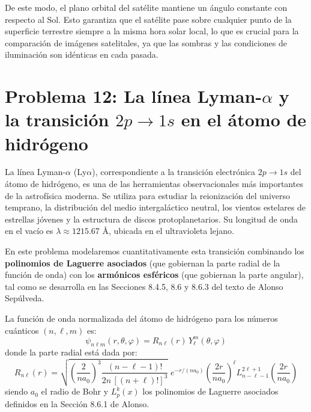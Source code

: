 \documentclass[a4paper]{article}
\begin{document}
De este modo, el plano orbital del satélite mantiene un ángulo constante con respecto al Sol. Esto garantiza que el satélite pase sobre cualquier punto de la superficie terrestre siempre a la misma hora solar local, lo que es crucial para la comparación de imágenes satelitales, ya que las sombras y las condiciones de iluminación son idénticas en cada pasada.



\section{Problema 12: La línea Lyman-$\alpha$ y la transición $2p \to 1s$ en el átomo de hidrógeno}

La línea Lyman-$\alpha$ (Ly$\alpha$), correspondiente a la transición electrónica $2p \to 1s$ del átomo de hidrógeno, es una de las herramientas observacionales más importantes de la astrofísica moderna. Se utiliza para estudiar la reionización del universo temprano, la distribución del medio intergaláctico neutral, los vientos estelares de estrellas jóvenes y la estructura de discos protoplanetarios. Su longitud de onda en el vacío es $\lambda \approx 1215.67$ \AA, ubicada en el ultravioleta lejano.

En este problema modelaremos cuantitativamente esta transición combinando los \textbf{polinomios de Laguerre asociados} (que gobiernan la parte radial de la función de onda) con los \textbf{armónicos esféricos} (que gobiernan la parte angular), tal como se desarrolla en las Secciones 8.4.5, 8.6 y 8.6.3 del texto de Alonso Sepúlveda.

La función de onda normalizada del átomo de hidrógeno para los números cuánticos $(n, \ell, m)$ es:
$$
\psi_{n\ell m}(r, \theta, \varphi) = R_{n\ell}(r)\, Y_\ell^m(\theta, \varphi)
$$
donde la parte radial está dada por:
$$
R_{n\ell}(r) = \sqrt{\left(\frac{2}{n a_0}\right)^3 \frac{(n-\ell-1)!}{2n\,[(n+\ell)!]^3}}\; e^{-r/(n a_0)} \left(\frac{2r}{n a_0}\right)^\ell L_{n-\ell-1}^{2\ell+1}\!\left(\frac{2r}{n a_0}\right)
$$
siendo $a_0$ el radio de Bohr y $L_p^k(x)$ los polinomios de Laguerre asociados definidos en la Sección 8.6.1 de Alonso.
\end{document}
